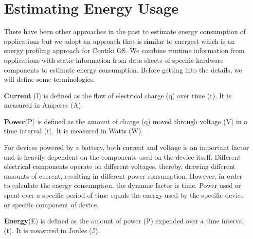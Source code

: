 \section{Estimating Energy Usage}
There have been other approaches in the past to estimate energy consumption of applications \cite{6606555} but we 
adopt an approach that is similar to energest \cite{energest} which is an energy profiling approach for Contiki OS. 
We combine runtime information from applications with static information from data sheets of specific 
hardware components to estimate energy consumption. Before getting into the details, we will define some 
terminologies. \\

\begin{definition}
    \textbf{Current }(I) is defined as the flow of electrical charge (q) over time (t). It is measured in Amperes (A).
\end{definition}

\begin{definition}
    \textbf{Power}(P) is defined as the amount of charge (q) moved through voltage (V) in a time interval (t). It is measured in Watts (W).
\end{definition}

For devices powered by a battery, both current and voltage is an important factor and is heavily dependent 
on the components used on the device itself. Different electrical components operate on different voltages, thereby, 
drawing different amounts of current, resulting in different power consumption. However, in order to calculate the 
energy consumption, the dynamic factor is time. Power used or spent over a specific period of time equals the 
energy used by the specific device or specific component of device. 

\begin{definition}
    \textbf{Energy}(E) is defined as the amount of power (P) expended over a time interval (t). It is measured in Joules (J).
\end{definition}

